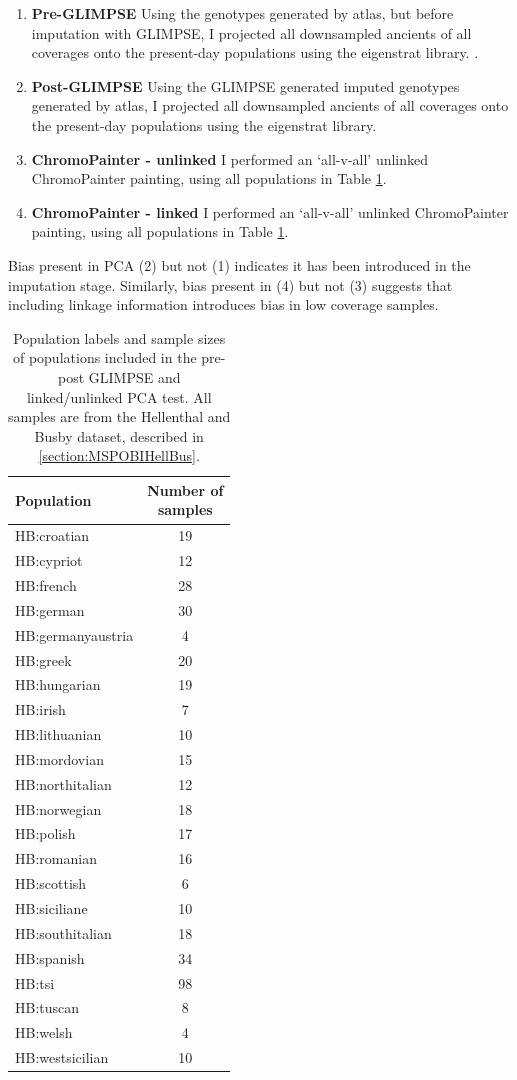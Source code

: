 \begin{enumerate}
\item \textbf{Pre-GLIMPSE} Using the genotypes generated by atlas, but before imputation with GLIMPSE, I projected all downsampled ancients of all coverages onto the present-day populations using the eigenstrat library. \cite{Price2006}.
\item \textbf{Post-GLIMPSE} Using the GLIMPSE generated imputed genotypes generated by atlas, I projected all downsampled ancients of all coverages onto the present-day populations using the eigenstrat library.
\item \textbf{ChromoPainter - unlinked} I performed an `all-v-all' unlinked ChromoPainter painting, using all populations in Table \ref{tab:HB_pops}. 
\item \textbf{ChromoPainter - linked} I performed an `all-v-all' unlinked ChromoPainter painting, using all populations in Table \ref{tab:HB_pops}.
\end{enumerate}

Bias present in PCA (2) but not (1) indicates it has been introduced in the imputation stage. Similarly, bias present in (4) but not (3) suggests that including linkage information introduces bias in low coverage samples. 


\begin{table}
\centering
\begin{tabular}[t]{lc}
\toprule
Population & \thead{Number of\\ samples}\\
\midrule
HB:croatian & 19\\
HB:cypriot & 12\\
HB:french & 28\\
HB:german & 30\\
HB:germanyaustria & 4\\
HB:greek & 20\\
HB:hungarian & 19\\
HB:irish & 7\\
HB:lithuanian & 10\\
HB:mordovian & 15\\
HB:northitalian & 12\\
HB:norwegian & 18\\
HB:polish & 17\\
HB:romanian & 16\\
HB:scottish & 6\\
HB:siciliane & 10\\
HB:southitalian & 18\\
HB:spanish & 34\\
HB:tsi & 98\\
HB:tuscan & 8\\
HB:welsh & 4\\
HB:westsicilian & 10\\
\bottomrule
\end{tabular}
\caption{Population labels and sample sizes of populations included in the pre-post GLIMPSE and linked/unlinked PCA test. All samples are from the Hellenthal and Busby dataset, described in \ref{section:MSPOBIHellBus}.}
\label{tab:HB_pops}
\end{table}


